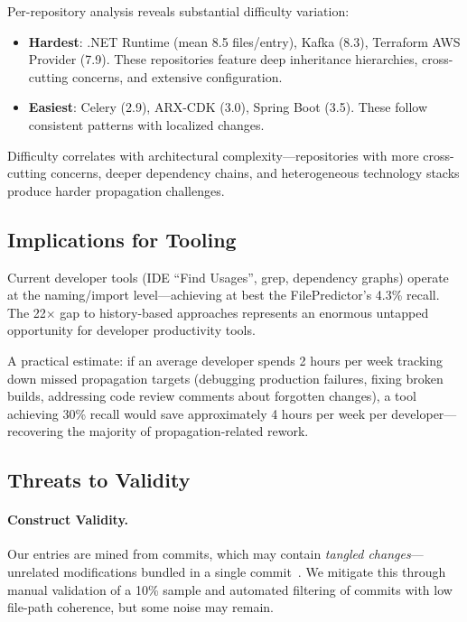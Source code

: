 \documentclass[sigconf,nonacm]{acmart}
\begin{document}
Per-repository analysis reveals substantial difficulty variation:
\begin{itemize}
    \item \textbf{Hardest}: .NET Runtime (mean 8.5 files/entry), Kafka (8.3), Terraform AWS Provider (7.9). These repositories feature deep inheritance hierarchies, cross-cutting concerns, and extensive configuration.
    \item \textbf{Easiest}: Celery (2.9), ARX-CDK (3.0), Spring Boot (3.5). These follow consistent patterns with localized changes.
\end{itemize}

Difficulty correlates with architectural complexity---repositories with more cross-cutting concerns, deeper dependency chains, and heterogeneous technology stacks produce harder propagation challenges.

\subsection{Implications for Tooling}

Current developer tools (IDE ``Find Usages'', grep, dependency graphs) operate at the naming/import level---achieving at best the FilePredictor's 4.3\% recall. The 22$\times$ gap to history-based approaches represents an enormous untapped opportunity for developer productivity tools.

A practical estimate: if an average developer spends 2 hours per week tracking down missed propagation targets (debugging production failures, fixing broken builds, addressing code review comments about forgotten changes), a tool achieving 30\% recall would save approximately 4 hours per week per developer---recovering the majority of propagation-related rework.

\subsection{Threats to Validity}

\paragraph{Construct Validity.} Our entries are mined from commits, which may contain \emph{tangled changes}---unrelated modifications bundled in a single commit~\cite{herzig2013}. We mitigate this through manual validation of a 10\% sample and automated filtering of commits with low file-path coherence, but some noise may remain.
\end{document}
